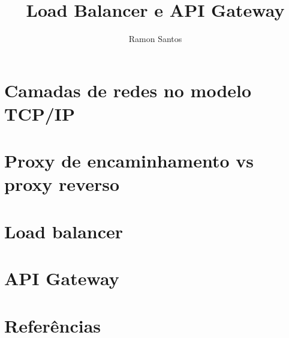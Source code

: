 \documentclass{beamer}
\title{Load Balancer e API Gateway}
\subtitle{}
\author{Ramon Santos}
\begin{document}
\maketitle


\section{Camadas de redes no modelo TCP/IP}


\section{Proxy de encaminhamento vs proxy reverso}


\section{Load balancer}


\section{API Gateway}


\section{Referências}


\backmatter
\end{document}
